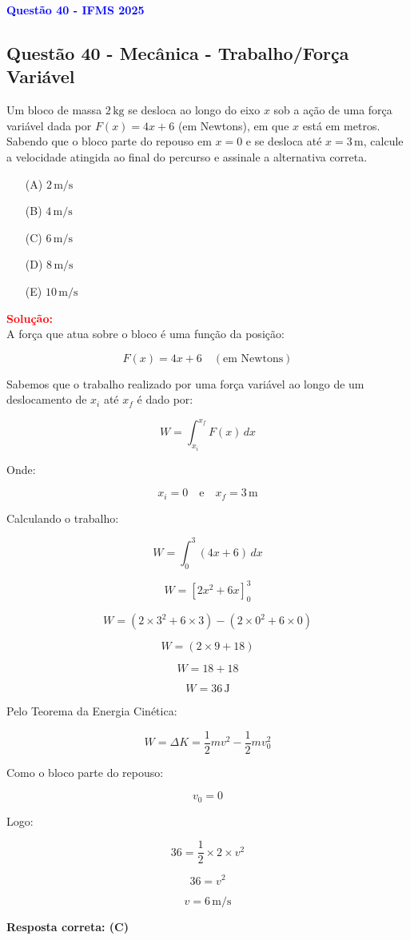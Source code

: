\documentclass[a4paper,12pt]{article}
\begin{document}
\begin{flushleft}
\textbf{\textcolor{blue}{\Large Quest\~ao 40 - IFMS 2025}}\\
\subsection{Quest\~ao 40 - Mecânica - Trabalho/Força Vari\'avel}
Um bloco de massa $2\,\text{kg}$ se desloca ao longo do eixo $x$ sob a ação de uma força variável dada por 
$F(x) = 4x + 6$ (em Newtons), em que $x$ está em metros. Sabendo que o bloco parte do repouso em $x = 0$ e se 
desloca até $x = 3\,\text{m}$, calcule a velocidade atingida ao final do percurso e assinale a alternativa correta.

\begin{enumerate}
\item[(A)] $2\,\text{m/s}$
\item[(B)] $4\,\text{m/s}$
\item[(C)] $6\,\text{m/s}$
\item[(D)] $8\,\text{m/s}$
\item[(E)] $10\,\text{m/s}$
\end{enumerate}

\vspace{0.5cm}

\textcolor{red}{\textbf{Solução:}}\\

A força que atua sobre o bloco é uma função da posição:

\[
F(x) = 4x + 6 \quad (\text{em Newtons})
\]

Sabemos que o trabalho realizado por uma força variável ao longo de um deslocamento de $x_i$ até $x_f$ é dado por:

\[
W = \int_{x_i}^{x_f} F(x) \, dx
\]

Onde:

\[
x_i = 0 \quad \text{e} \quad x_f = 3\,\text{m}
\]

Calculando o trabalho:

\[
W = \int_{0}^{3} (4x + 6) \, dx
\]

\[
W = \left[ 2x^2 + 6x \right]_0^3
\]

\[
W = \left( 2 \times 3^2 + 6 \times 3 \right) - \left( 2 \times 0^2 + 6 \times 0 \right)
\]

\[
W = \left( 2 \times 9 + 18 \right)
\]

\[
W = 18 + 18
\]

\[
W = 36\,\text{J}
\]

Pelo Teorema da Energia Cinética:

\[
W = \Delta K = \frac{1}{2} m v^2 - \frac{1}{2} m v_0^2
\]

Como o bloco parte do repouso:

\[
v_0 = 0
\]

Logo:

\[
36 = \frac{1}{2} \times 2 \times v^2
\]

\[
36 = v^2
\]

\[
v = 6\,\text{m/s}
\]

\textbf{Resposta correta: \colorbox{green!50}{(C)}}

\end{flushleft}
\end{document}
